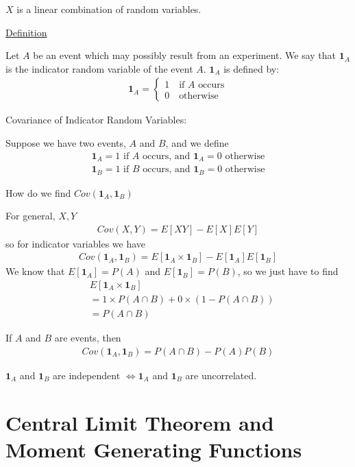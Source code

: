 \documentclass{article}
\begin{document}
$X$ is a linear combination of random variables. 

\underline{Definition}

Let $A$ be an event which may possibly result from an experiment. We say that $\mathbf{1}_A$ is the indicator random variable of the event $A$. $\mathbf{1}_A$ is defined by:
\begin{align*}
    \mathbf{1}_A = \begin{cases}
        1 \quad \text{if } A \text{ occurs} \\
        0 \quad \text{otherwise}
    \end{cases}
\end{align*}

Covariance of Indicator Random Variables:

Suppose we have two events, $A$ and $B$, and we define
\begin{align*}
    \mathbf{1}_A = 1 \text{ if } A \text{ occurs, and } \mathbf{1}_A = 0 \text{ otherwise} \\
    \mathbf{1}_B = 1 \text{ if } B \text{ occurs, and } \mathbf{1}_B = 0 \text{ otherwise}
\end{align*}

How do we find $Cov(\mathbf{1}_A, \mathbf{1}_B)$

For general, $X, Y$
\begin{align*}
    Cov(X,Y) = E[XY] - E[X]E[Y]
\end{align*}
so for indicator variables we have
\begin{align*}
    Cov(\mathbf{1}_A, \mathbf{1}_B) = E[\mathbf{1}_A \times \mathbf{1}_B] - E[\mathbf{1}_A]E[\mathbf{1}_B]
\end{align*}
We know that $E[\mathbf{1}_A] = P(A)$ and $E[\mathbf{1}_B] = P(B)$, so we just have to find
\begin{align*}
    &E[\mathbf{1}_A \times \mathbf{1}_B] \\
    &= 1 \times P(A \cap B) + 0 \times (1 - P(A \cap B))\\
    &= P(A \cap B) 
\end{align*}

If $A$ and $B$ are events, then
\begin{align*}
    Cov(\mathbf{1}_A, \mathbf{1}_B) = P(A \cap B) - P(A)P(B)
\end{align*}

$\mathbf{1}_A$ and $\mathbf{1}_B$ are independent $\iff \mathbf{1}_A$ and $\mathbf{1}_B$ are uncorrelated. 

\section{Central Limit Theorem and Moment Generating Functions}
\end{document}
